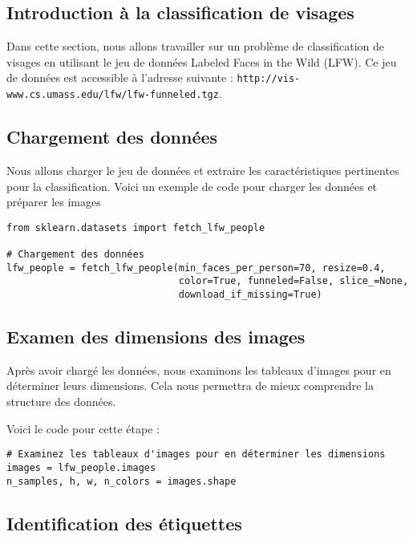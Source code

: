\documentclass{article}
\begin{document}
\begin{itemize}
\section{Introduction à la classification de visages}

Dans cette section, nous allons travailler sur un problème de 
classification de visages en utilisant le jeu de données Labeled Faces in 
the Wild (LFW). Ce jeu de données est accessible à l'adresse suivante : 
\texttt{http://vis-www.cs.umass.edu/lfw/lfw-funneled.tgz}.\\
\subsection{Chargement des données}

Nous allons charger le jeu de données et extraire les caractéristiques 
pertinentes pour la classification. Voici un exemple de code pour charger 
les données et préparer les images 
\begin{verbatim}
from sklearn.datasets import fetch_lfw_people

# Chargement des données 
lfw_people = fetch_lfw_people(min_faces_per_person=70, resize=0.4,
                              color=True, funneled=False, slice_=None,
                              download_if_missing=True)
\end{verbatim}

\subsection{Examen des dimensions des images}

Après avoir chargé les données, nous examinons les tableaux d'images pour 
en déterminer leurs dimensions. Cela nous permettra de mieux comprendre 
la structure des données.


Voici le code pour cette étape :

\begin{verbatim}
# Examinez les tableaux d'images pour en déterminer les dimensions 
images = lfw_people.images
n_samples, h, w, n_colors = images.shape
\end{verbatim}
\subsection{Identification des étiquettes}


\end{itemize}
\end{document}
